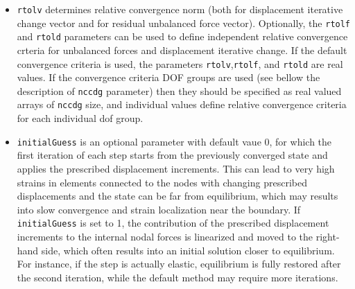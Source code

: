 \documentclass[a4paper]{article}
\newcommand{\param}[1]{\texttt{#1}} %
\begin{document}
\begin{itemize}
\item \param{rtolv} determines relative convergence norm (both for displacement
iterative change vector and for residual unbalanced force vector). Optionally, the \param{rtolf} and \param{rtold} parameters can be used to define
independent relative convergence crteria for unbalanced forces and displacement
iterative change. If the default convergence criteria is used,
the parameters \param{rtolv},\param{rtolf}, and \param{rtold} are real values. If the convergence criteria DOF groups are used (see bellow the description of \param{nccdg} parameter) then they should be specified as real valued arrays of \param{nccdg} size, and individual values define relative convergence criteria for each individual dof group.
\item \param{initialGuess} is an optional parameter with default vaue 0, for which the first iteration of each step starts from the previously converged state and applies the prescribed displacement increments. This can lead to very high strains in elements connected to the nodes with changing prescribed displacements and the state can be far from equilibrium, which may results into slow convergence and strain localization near the boundary. If \param{initialGuess} is set to 1, the contribution of the prescribed displacement increments to the internal nodal forces is linearized and moved to the right-hand side, which often results into an initial solution closer to equilibrium. For instance, if the step is actually elastic, equilibrium is fully restored after the second iteration, while the default method may require more iterations.  
\end{itemize}
\end{document}
